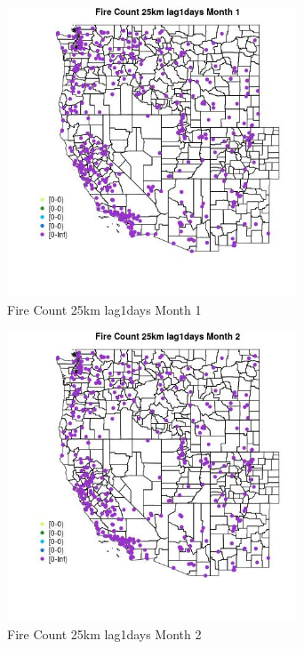 \begin{figure} 
\centering  
\includegraphics[width=0.77\textwidth]{Code_Outputs/Report_ML_input_PM25_Step4_part_e_de_duplicated_aves_compiled_2019-05-18wNAs_MapObsMo1Fire_Count_25km_lag1days.jpg} 
\caption{\label{fig:Report_ML_input_PM25_Step4_part_e_de_duplicated_aves_compiled_2019-05-18wNAsMapObsMo1Fire_Count_25km_lag1days}Fire Count 25km lag1days Month 1} 
\end{figure} 
 

\begin{figure} 
\centering  
\includegraphics[width=0.77\textwidth]{Code_Outputs/Report_ML_input_PM25_Step4_part_e_de_duplicated_aves_compiled_2019-05-18wNAs_MapObsMo2Fire_Count_25km_lag1days.jpg} 
\caption{\label{fig:Report_ML_input_PM25_Step4_part_e_de_duplicated_aves_compiled_2019-05-18wNAsMapObsMo2Fire_Count_25km_lag1days}Fire Count 25km lag1days Month 2} 
\end{figure} 
 

